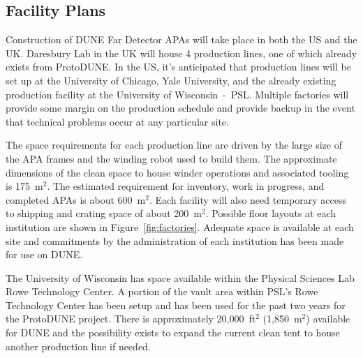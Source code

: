 \subsection{Facility Plans}
\label{sec:fdsp-apa-facility}

Construction of DUNE Far Detector APAs will take place in both the US and the UK. Daresbury Lab in the UK will house 4 production lines, one of which already exists from ProtoDUNE. In the US, it's anticipated that production lines will be set up at the University of Chicago, Yale University, and the already existing production facility at the University of Wisconsin~-~PSL. %
Multiple factories will provide some margin on the production schedule and provide backup in the event that technical problems occur at any particular site. 

The space requirements for each production line are driven by the large size of the APA frames and the winding robot used to build them. The approximate dimensions of the clean space to house winder operations and associated tooling is 175~m$^2$. The estimated requirement for inventory, work in progress, and completed APAs is about 600~m$^2$. Each facility will also need temporary access to shipping and crating space of about 200~m$^2$. Possible floor layouts at each institution are shown in Figure~\ref{fig:factories}. Adequate space is available at each site and commitments by the administration of each institution has been made for use on DUNE. 

The University of Wisconsin has space available within the Physical Sciences Lab Rowe Technology Center. A portion of the vault area within PSL's Rowe Technology Center has been setup and has been used for the past two years for the ProtoDUNE project. There is approximately 20,000~ft$^2$ (1,850~m$^2$) available for DUNE and the possibility exists to expand the current clean tent to house another production line if needed. 


